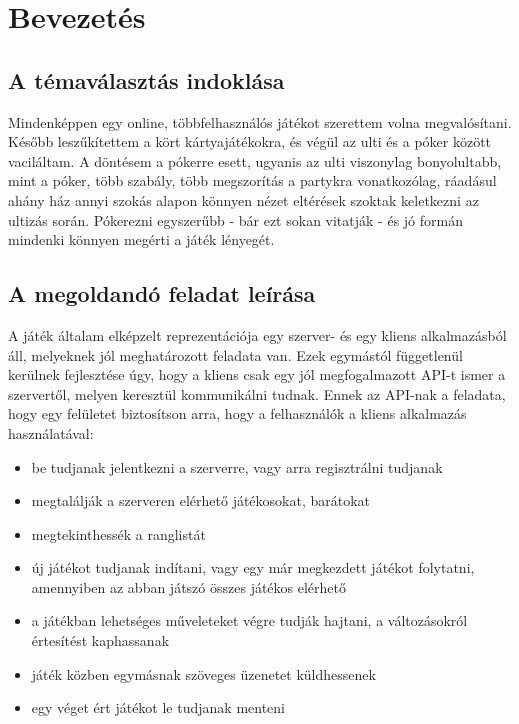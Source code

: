 \section{Bevezetés}

\subsection{A témaválasztás indoklása}
Mindenképpen egy online, többfelhasználós játékot szerettem volna megvalósítani. Később leszűkítettem a kört kártyajátékokra, és végül az ulti és a póker között vaciláltam. A döntésem a pókerre esett, ugyanis az ulti viszonylag bonyolultabb, mint a póker, több szabály, több megszorítás a partykra vonatkozólag, ráadásul ahány ház annyi szokás alapon könnyen nézet eltérések szoktak keletkezni az ultizás során. Pókerezni egyszerűbb - bár ezt sokan vitatják - és jó formán mindenki könnyen megérti a játék lényegét.

\subsection{A megoldandó feladat leírása}
A játék általam elképzelt reprezentációja egy szerver- és egy kliens alkalmazásból
áll, melyeknek jól meghatározott feladata van. Ezek egymástól függetlenül kerülnek
fejlesztése úgy, hogy a kliens csak egy jól megfogalmazott API-t ismer a szervertől,
melyen keresztül kommunikálni tudnak. Ennek az API-nak a feladata, hogy egy felületet
biztosítson arra, hogy a felhasználók a kliens alkalmazás használatával:

\begin{itemize}
  \item be tudjanak jelentkezni a szerverre, vagy arra regisztrálni tudjanak
  \item megtalálják a szerveren elérhető játékosokat, barátokat
  \item megtekinthessék a ranglistát
  \item új játékot tudjanak indítani, vagy egy már megkezdett játékot folytatni, amennyiben az abban játszó összes játékos elérhető
  \item a játékban lehetséges műveleteket végre tudják hajtani, a változásokról értesítést kaphassanak
  \item játék közben egymásnak szöveges üzenetet küldhessenek
  \item egy véget ért játékot le tudjanak menteni
\end{itemize}

